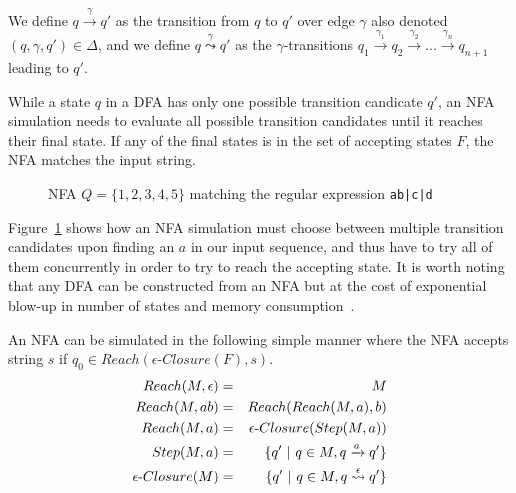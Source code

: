 \documentclass[12pt]{article}
\theoremstyle{definition}
\begin{document}
We define $q \xrightarrow{\gamma} q'$ as the transition from $q$ to $q'$ over edge $\gamma$ also denoted $(q, \gamma, q') \in \Delta$, and we define $q \overset{\gamma}{\leadsto} q'$ as the $\gamma$-transitions $q_1 \xrightarrow{\gamma_1} q_{2} \xrightarrow{\gamma_{2}} ... \xrightarrow{\gamma_{n}} q_{n+1}$ leading to $q'$.

While a state $q$ in a DFA has only one possible transition candicate $q'$, an NFA simulation needs to evaluate all possible transition candidates until it reaches their final state. If any of the final states is in the set of accepting states $F$, the NFA matches the input string.

\begin{figure}[H]
  \begin{center}

	
	\caption{NFA $Q = \{1, 2, 3, 4, 5\}$ matching the regular expression \texttt{ab|c|d}}
	\label{nfa_simple}
  \end{center}
\end{figure}

Figure~\ref{nfa_simple} shows how an NFA simulation must choose between multiple transition candidates upon finding an $a$ in our input sequence, and thus have to try all of them concurrently in order to try to reach the accepting state. It is worth noting that any DFA can be constructed from an NFA but at the cost of exponential blow-up in number of states and memory consumption~\cite{nfa-to-dfa}.

An NFA can be simulated in the following simple manner where the NFA accepts string $s$ if $q_0 \in Reach(\epsilon\text{-}Closure(F), s)$.
\begin{eqnarray}
	Reach(M, \epsilon) & = & M  \notag \\
	Reach(M, ab) & = & Reach(Reach(M, a), b) \notag \\
	Reach(M, a) & = & \epsilon\text{-}Closure(Step(M, a)) \notag \\
	Step(M, a) & = & \{ q'\ |\ q \in M, q \xrightarrow{a} q' \} \notag \\
	\epsilon\text{-}Closure(M) & = & \{ q'\ |\ q \in M, q \overset{\epsilon}{\leadsto} q' \} \notag 
\end{eqnarray}
\end{document}
